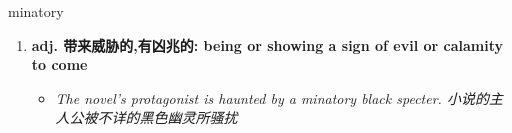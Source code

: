 
\begin{frame}
{\huge minatory}
\begin{center}
\begin{enumerate}\Large
  \item \textbf{adj. 带来威胁的,有凶兆的: being or showing a sign of evil or calamity to come}
  \begin{itemize}
    \item \em{\Large{The novel's protagonist is haunted by a minatory black specter. 小说的主人公被不详的黑色幽灵所骚扰}}
  \end{itemize}
\end{enumerate}
\end{center}
\end{frame}
